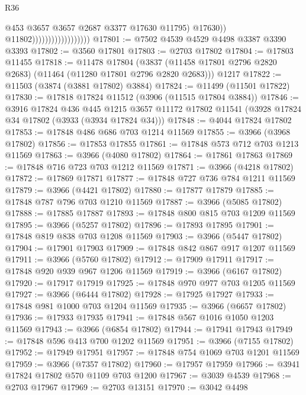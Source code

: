 \begin{lexlean}{R36}
\begin{coremodule}
                                              @453
                                              @3657
                                              @3657
                                              @2687
                                              @3377
                                              @17630
                                              @11795)
                                            @17630))
                                        @11802))))))))))))))))))
@17801 := @7502 @4539 @4529 @4498 @3387 @3390 @3393
@17802 := @3560 @17801
@17803 := @2703 @17802
@17804 := @17803 @11455
@17818 := @11478
    @17804
    (@3837 (@11458 @17801 @2796 @2820 @2683) (@11464 (@11280 @17801 @2796 @2820 @2683)))
    @1217
@17822 := @11503 (@3874 (@3881 @17802) @3884)
@17824 := @11499 (@11501 @17822)
@17830 := @17818 @17824 @11512 (@3906 (@11515 @17804 @3884))
@17846 := @3916
    @17824
    @436
    @445
    @1215
    @3657
    @11172
    @17802
    @11541
    (@3928 @17824 @34 @17802 (@3933 (@3934 @17824 @34)))
@17848 := @4044 @17824 @17802
@17853 := @17848 @486 @686 @703 @1214 @11569
@17855 := @3966 (@3968 @17802)
@17856 := @17853 @17855
@17861 := @17848 @573 @712 @703 @1213 @11569
@17863 := @3966 (@4080 @17802)
@17864 := @17861 @17863
@17869 := @17848 @716 @723 @703 @1212 @11569
@17871 := @3966 (@4218 @17802)
@17872 := @17869 @17871
@17877 := @17848 @727 @736 @784 @1211 @11569
@17879 := @3966 (@4421 @17802)
@17880 := @17877 @17879
@17885 := @17848 @787 @796 @703 @1210 @11569
@17887 := @3966 (@5085 @17802)
@17888 := @17885 @17887
@17893 := @17848 @800 @815 @703 @1209 @11569
@17895 := @3966 (@5257 @17802)
@17896 := @17893 @17895
@17901 := @17848 @819 @838 @703 @1208 @11569
@17903 := @3966 (@5447 @17802)
@17904 := @17901 @17903
@17909 := @17848 @842 @867 @917 @1207 @11569
@17911 := @3966 (@5760 @17802)
@17912 := @17909 @17911
@17917 := @17848 @920 @939 @967 @1206 @11569
@17919 := @3966 (@6167 @17802)
@17920 := @17917 @17919
@17925 := @17848 @970 @977 @703 @1205 @11569
@17927 := @3966 (@6444 @17802)
@17928 := @17925 @17927
@17933 := @17848 @981 @1000 @703 @1204 @11569
@17935 := @3966 (@6657 @17802)
@17936 := @17933 @17935
@17941 := @17848 @567 @1016 @1050 @1203 @11569
@17943 := @3966 (@6854 @17802)
@17944 := @17941 @17943
@17949 := @17848 @596 @413 @700 @1202 @11569
@17951 := @3966 (@7155 @17802)
@17952 := @17949 @17951
@17957 := @17848 @754 @1069 @703 @1201 @11569
@17959 := @3966 (@7357 @17802)
@17960 := @17957 @17959
@17966 := @3941 @17824 @17802 @570 @1109 @703 @1200
@17967 := @3039 @4539
@17968 := @2703 @17967
@17969 := @2703 @13151
@17970 := @3042 @4498

\end{coremodule}
\end{lexlean}
